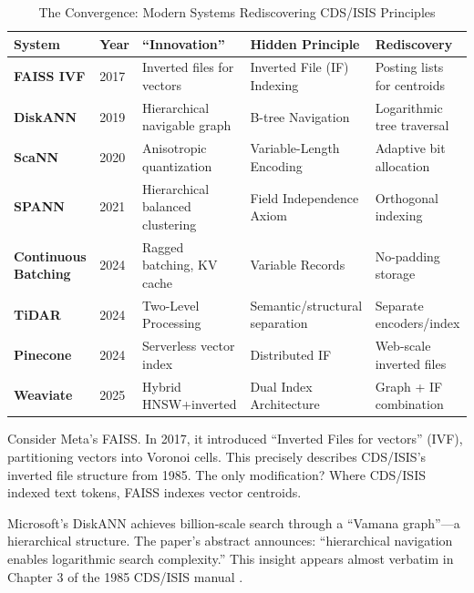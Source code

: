 \documentclass[manuscript,screen,nonacm]{acmart}
\begin{document}
\begin{table}[h]
\centering
\caption{The Convergence: Modern Systems Rediscovering CDS/ISIS Principles}
\label{tab:convergence}
\begin{tabular}{p{} p{} p{} p{} p{}}
\toprule
\textbf{System} & \textbf{Year} & \textbf{``Innovation''} & \textbf{Hidden Principle} & \textbf{Rediscovery} \\
\midrule
\textbf{FAISS IVF} \cite{johnson2017} & 2017 & Inverted files for vectors & Inverted File (IF) Indexing & Posting lists for centroids \\
\textbf{DiskANN} \cite{subramanya2019} & 2019 & Hierarchical navigable graph & B-tree Navigation & Logarithmic tree traversal \\
\textbf{ScaNN} \cite{guo2020} & 2020 & Anisotropic quantization & Variable-Length Encoding & Adaptive bit allocation \\
\textbf{SPANN} \cite{chen2021} & 2021 & Hierarchical balanced clustering & Field Independence Axiom & Orthogonal indexing \\
\textbf{Continuous Batching} \cite{algoinsights2024} & 2024 & Ragged batching, KV cache & Variable Records & No-padding storage \\
\textbf{TiDAR} \cite{liu2024} & 2024 & Two-Level Processing & Semantic/structural separation & Separate encoders/index \\
\textbf{Pinecone} \cite{pinecone2024} & 2024 & Serverless vector index & Distributed IF & Web-scale inverted files \\
\textbf{Weaviate} \cite{weaviate2025} & 2025 & Hybrid HNSW+inverted & Dual Index Architecture & Graph + IF combination \\
\bottomrule
\end{tabular}
\end{table}

Consider Meta's FAISS. In 2017, it introduced ``Inverted Files for vectors'' (IVF), partitioning vectors into Voronoi cells. This precisely describes CDS/ISIS's inverted file structure from 1985. The only modification? Where CDS/ISIS indexed text tokens, FAISS indexes vector centroids.

Microsoft's DiskANN achieves billion-scale search through a ``Vamana graph''---a hierarchical structure. The paper's abstract announces: ``hierarchical navigation enables logarithmic search complexity.'' This insight appears almost verbatim in Chapter 3 of the 1985 CDS/ISIS manual \cite{unesco1989}.
\end{document}
